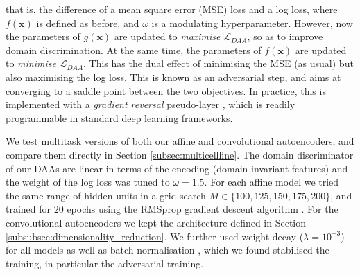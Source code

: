 that is, the difference of a mean square error (MSE) loss and a log loss, where $f(\mathbf{x})$ is defined as before, and $\omega$ is a modulating hyperparameter. However, now the parameters of $g(\mathbf{x})$ are updated to \emph{maximise} $\mathcal{L}_{DAA}$, so as to improve domain discrimination. At the same time, the parameters of $f(\mathbf{x})$ are updated to \emph{minimise} $\mathcal{L}_{DAA}$. This has the dual effect of minimising the MSE (as usual) but also maximising the log loss. This is known as an adversarial step, and aims at converging to a saddle point between the two objectives. In practice, this is implemented with a \emph{gradient reversal} pseudo-layer \cite{ganin2016domain}, which is readily programmable in standard deep learning frameworks.

We test multitask versions of both our affine and convolutional autoencoders, and compare them directly in Section \ref{subsec:multicellline}. The domain discriminator of our DAAs are linear in terms of the encoding (domain invariant features) and the weight of the log loss was tuned to $\omega = 1.5$. For each affine model we tried the same range of hidden units in a grid search $M \in \{100, 125, 150, 175, 200\}$, and trained for $20$ epochs using the RMSprop gradient descent algorithm \cite{tieleman2012lecture}. For the convolutional autoencoders we kept the architecture defined in Section \ref{subsubsec:dimensionality_reduction}. We further used weight decay ($\lambda = 10^{-3}$) for all models as well as batch normalisation \cite{ioffe2015batch}, which we found stabilised the training, in particular the adversarial training.


